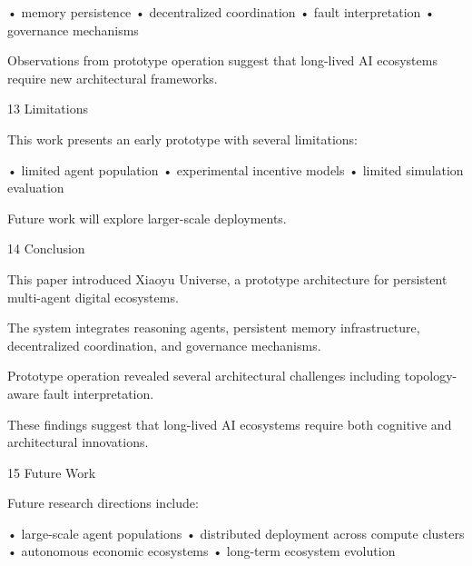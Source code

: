 • memory persistence
• decentralized coordination
• fault interpretation
• governance mechanisms

Observations from prototype operation suggest that long-lived AI ecosystems require new architectural frameworks.

13 Limitations

This work presents an early prototype with several limitations:

• limited agent population
• experimental incentive models
• limited simulation evaluation

Future work will explore larger-scale deployments.

14 Conclusion

This paper introduced Xiaoyu Universe, a prototype architecture for persistent multi-agent digital ecosystems.

The system integrates reasoning agents, persistent memory infrastructure, decentralized coordination, and governance mechanisms.

Prototype operation revealed several architectural challenges including topology-aware fault interpretation.

These findings suggest that long-lived AI ecosystems require both cognitive and architectural innovations.

15 Future Work

Future research directions include:

• large-scale agent populations
• distributed deployment across compute clusters
• autonomous economic ecosystems
• long-term ecosystem evolution
